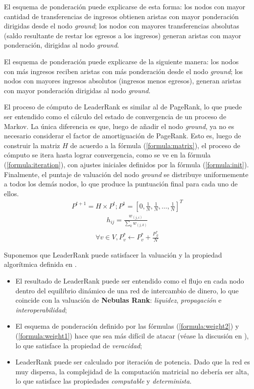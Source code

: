 El esquema de ponderación puede explicarse de esta forma: los nodos con mayor cantidad de transferencias de ingresos obtienen aristas con mayor ponderación dirigidas desde el nodo \textit{ground}; los nodos con mayores transferencias absolutas (saldo resultante de restar los egresos a los ingresos) generan aristas con mayor ponderación, dirigidas al nodo \textit{ground}.

El esquema de ponderación puede explicarse de la siguiente manera: los nodos con más ingresos reciben aristas con más ponderación desde el nodo \textit{ground}; los nodos con mayores ingresos absolutos (ingresos menos egresos), generan aristas con mayor ponderación dirigidas al nodo \textit{ground}.

El proceso de cómputo de LeaderRank es similar al de PageRank, lo que puede ser entendido como el cálculo del estado de convergencia de un proceso de Markov. La única diferencia es que, luego de añadir el nodo \textit{ground}, ya no es necesario considerar el factor de amortiguación de PageRank\cite{Brin2010}\cite{page1999pagerank}. Esto es, luego de construir la matriz $H$ de acuerdo a la fórmula (\ref{formula:matrix}), el proceso de cómputo se itera hasta lograr convergencia, como se ve en la fórmula (\ref{formula:iteration}), con ajustes iniciales definidos por la fórmula (\ref{formula:init}). Finalmente, el puntaje de valuación del nodo \textit{ground} se distribuye uniformemente a todos los demás nodos, lo que produce la puntuación final para cada uno de ellos.
\begin{align} \label{formula:iteration}
	P^{t+1} = H \times P^{t}; P^1=[0, \frac{1}{N}, \frac{1}{N}, \dots, \frac{1}{N}]^T
\end{align}
\begin{align} \label{formula:matrix}
	h_{ij} = \frac{w_{(j,i)}}{\sum_k w_{(j,k)}}
\end{align}
\begin{align} \label{formula:init}
\forall v \in V, P^*_v \leftarrow P^*_v + \frac{P^*_{\mathcal{G}}}{N}
\end{align}

Suponemos que LeaderRank puede satisfacer la valuación y la propiedad algorítmica definida en .
\begin{itemize}
	\item El resultado de LeaderRank puede ser entendido como el flujo en cada nodo dentro del equilibrio dinámico de una red de intercambio de dinero, lo que coincide con la valuación de \textbf{Nebulas Rank}: \textit{liquidez}, \textit{propagación} e \textit{interoperabilidad};
	\item El esquema de ponderación definido por las fórmulas (\ref{formula:weight2}) y (\ref{formula:weight1}) hace que sea más difícil de atacar (véase la discusión en ), lo que satisface la propiedad de \textit{veracidad};
	\item LeaderRank puede ser calculado por iteración de potencia. Dado que la red es muy dispersa, la complejidad de la computación matricial no debería ser alta, lo que satisface las propiedades \textit{computable} y \textit{determinista}.
\end{itemize}


